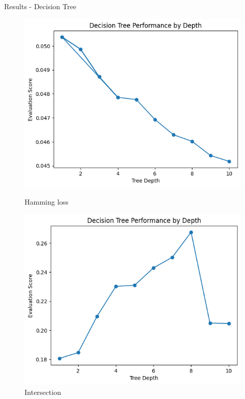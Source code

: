 \documentclass{beamer}
\begin{document}
\begin{frame}[t]{Results - Decision Tree}
\begin{figure}[h]
	\hfill
	\begin{minipage}{0.3\textwidth}
		\centering
		\includegraphics[width=\linewidth]{images/DecisionTree/hammingloss.png}
		\caption{Hamming loss}
	\end{minipage}
	\vfill
	\begin{minipage}{0.3\textwidth}
		\centering
		\includegraphics[width=\linewidth]{images/DecisionTree/jaccardscore.png}
		\caption{Intersection}
	\end{minipage}
	\hfill
	\begin{minipage}{0.3\textwidth}
		\centering

\end{minipage}
\end{figure}
\end{frame}
\end{document}
